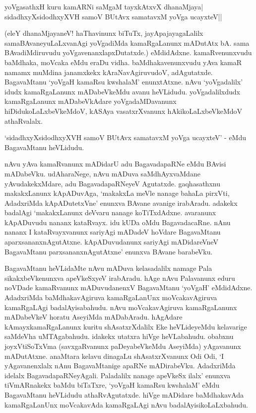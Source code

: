 \begin{shloka}
yoVgasathxH kuru kamARNi saMgaM tayxkAtxvX dhanaMjaya|\\
sidadhxyXsidodhxyXVH samoV BUtAvx samatavxM yoVga ucayxteV||
\end{shloka}

(eleY dhanaMjayaneV! haThavinunx biTuTx, jayApajayagaLalilx samaBAvaneyuLaLxvanAgi yoVgadiMda kamaRgaLanunx mADutAtx bA. sama BAvadiMdiruvudu yoVgavenanxlapxDutatxde.) eMdidAdxne. kamaRvenunxvudu baMdhaka, moVcaka eMdu eraDu vidha. baMdhakavenunxvudu yAva kamaR namamx muMdina janamxkekx kAraNavAgiruvudoV, adAgutatxde. BagavaMtanu `yoVgaH kamaRsu kwshalaM' enunxtAtxne. nAvu `yoVgadalilx' idudx kamaRgaLanunx mADabeVkeMdu avanu heVLidudu. yoVgadalilxdudx kamaRgaLanunx mADabeVkAdare yoVgadaMDavanunx hiDidukoLaLxbeVkeMdoV, kASAya vasatxrXvanunx hAkikoLaLxbeVkeMdoV athaRvalalx.

`sidadhxyXsidodhxyXVH samoV BUtAvx samatavxM yoVga ucayxteV' - eMdu BagavaMtanu heVLidudu.

nAvu yAva kamaRvanunx mADidarU adu BagavadapaRNe eMdu BAvisi mADabeVku. udAharaNege, nAvu mADuva saMdhAyxvaMdane yAvudakekxMdare, adu BagavadapaRNeyeV Agutatxde. gaqhasathxnu makakxLanunx kApADuvAga, `makakxLa meVle nanage bahaLa pirxVti, AdadxriMda kApADutetxVne' enunxva BAvane avanige irabAradu. adakekx badalAgi `makakxLanunx deVvaru nanage koTiTxdAdxne. avaranunx kApADuvudu nananx kataRvayx. idu kUDa oMdu BagavadacaRne. nAnu nananx I kataRvayxvanunx sariyAgi mADadeV hoVdare BagavaMtanu aparxsananxnAgutAtxne. kApADuvudanunx sariyAgi mADidareVneV BagavaMtanu parxsananxnAgutAtxne' enunxva BAvane barabeVku. 

BagavaMtanu heVLidaMte nAvu mADuva kelasadalilx namage Pala sikakxbeVkenunxva apeVkeSxyeV irabAradu. hAge nAvu Palavanunx eduru noVDade kamaRvanunx mADuvudanenxV BagavaMtanu `yoVgaH' eMdidAdxne. AdadxriMda baMdhakavAgiruva kamaRgaLanUnx moVcakavAgiruva kamaRgaLAgi badalAyisabahudu. nAvu moVcakavAgiruva kamaRgaLanunx mADabeVkeV horatu AseyiMda mADabAradu. hAgAdare kAmayxkamaRgaLanunx kuritu shAsatxrXdalilx Eke heVLideyeMdu kelavarige saMdeVha uMTAgabahudu. idakekx utatxra hiVge heVLabahudu. obabxnu joyxVtiSoTxVma (savxgaRvanunx paDeyabeVkeMdu AseyiMda) yAgavanunx mADutAtxne. anaMtara kelavu dinagaLu shAsatxrXvanunx Odi Odi, `I yAgavanenxlalx nAnu BagavaMtanige apaRNe mADirabeVku. AdadxriMda idelalx BagavadapaRNeyAgali. Paladalilx nanage apeVkeSx ilalx' enunxva tiVmARnakekx baMdu biTaTxre, `yoVgaH kamaRsu kwshalaM' eMdu BagavaMtanu heVLidudu athaRvAgutatxde. hiVge mADidare baMdhakavAda kamaRgaLanUnx moVcakavAda kamaRgaLAgi nAvu badalAyisikoLaLxbahudu.

